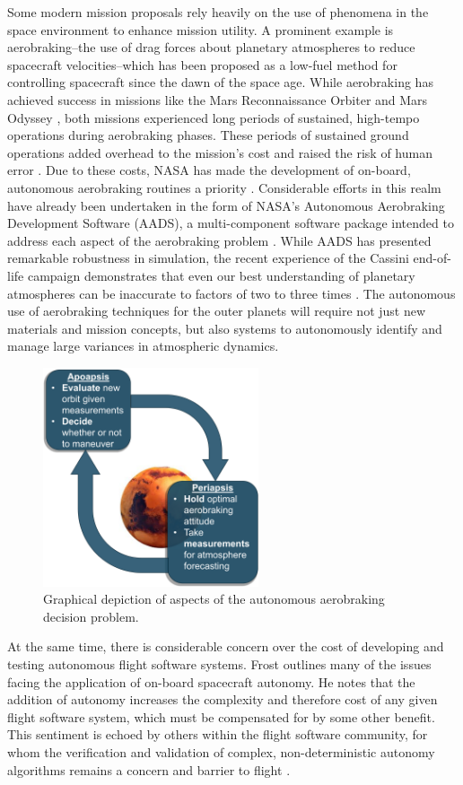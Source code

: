 \documentclass[paper,11pt]{AAS}		%
\begin{document}
Some modern mission proposals rely heavily on the use of phenomena in the space environment to enhance mission utility. A prominent example is aerobraking--the use of drag forces about planetary atmospheres to reduce spacecraft velocities--which has been proposed as a 
low-fuel method for controlling spacecraft since the dawn of the space age. While aerobraking has achieved 
success in missions like the Mars Reconnaissance Orbiter and Mars Odyssey \cite{Long2008}, both missions experienced
long periods of sustained, high-tempo operations during aerobraking phases. These periods of sustained ground operations added overhead to the mission's cost and raised the risk of human error \cite{Spencer2007}. Due to these costs, NASA has made the 
development of on-board, autonomous aerobraking routines a priority \cite{Long2008}. Considerable efforts in this realm have 
already been undertaken in the form of NASA's Autonomous Aerobraking Development Software (AADS), a multi-component software package intended to address each aspect of the aerobraking problem \cite{Cianciolo2018}. While AADS has presented remarkable robustness in simulation, the recent experience of the Cassini end-of-life campaign demonstrates that even our best understanding of planetary atmospheres can be inaccurate to factors of two to three times \cite{Andrade2018}. The autonomous use of aerobraking techniques for the outer planets will require not just new materials and mission concepts, but also systems to autonomously identify and manage large variances in atmospheric dynamics.

\begin{figure}[h]
	\centering
	\includegraphics[width=2.5in]{aeroDecisionmaking.png}
	\caption{Graphical depiction of aspects of the autonomous aerobraking decision problem.}
	\label{fig:aerobrakingChoices}
\end{figure}

At the same time, there is considerable concern over the cost of developing and testing autonomous flight software systems. Frost \cite{Frost2010} outlines many of the issues facing the application of on-board spacecraft autonomy. He notes that the addition of autonomy increases the complexity and therefore cost of any given flight software system, which must be compensated for by some other benefit. This sentiment is echoed by others within the flight software community, for whom the verification and validation of complex, non-deterministic autonomy algorithms remains a concern and barrier to flight \cite{Pecheur2000}. 
\end{document}
